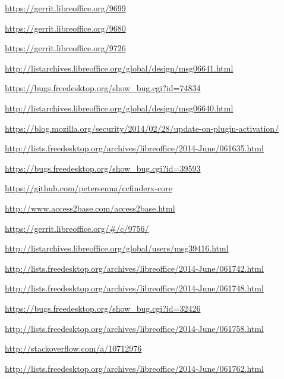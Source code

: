 \documentclass{article}
\begin{document}
\begin{thebibliography}{30}

\url{https://gerrit.libreoffice.org/9699}

\url{https://gerrit.libreoffice.org/9680}

\url{https://gerrit.libreoffice.org/9726}

\url{http://listarchives.libreoffice.org/global/design/msg06641.html}

\url{https://bugs.freedesktop.org/show_bug.cgi?id=74834}

\url{http://listarchives.libreoffice.org/global/design/msg06640.html}

\url{https://blog.mozilla.org/security/2014/02/28/update-on-plugin-activation/}

\url{http://lists.freedesktop.org/archives/libreoffice/2014-June/061635.html}

\url{https://bugs.freedesktop.org/show_bug.cgi?id=39593}

\url{https://github.com/petersenna/ccfinderx-core}

\url{http://www.access2base.com/access2base.html}

\url{https://gerrit.libreoffice.org/#/c/9756/}

\url{http://listarchives.libreoffice.org/global/users/msg39416.html}

\url{http://lists.freedesktop.org/archives/libreoffice/2014-June/061742.html}

\url{http://lists.freedesktop.org/archives/libreoffice/2014-June/061748.html}

\url{https://bugs.freedesktop.org/show_bug.cgi?id=32426}

\url{http://lists.freedesktop.org/archives/libreoffice/2014-June/061758.html}

\url{http://stackoverflow.com/a/10712976}

\url{http://lists.freedesktop.org/archives/libreoffice/2014-June/061762.html}


\end{thebibliography}
\end{document}
